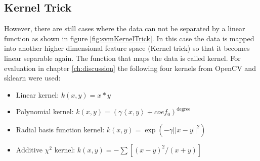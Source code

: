 \subsection*{Kernel Trick}
However, there are still cases where the data can not be separated by a linear function as shown in figure \ref{fig:svmKernelTrick}. In this case the data is mapped into another higher dimensional feature space {(Kernel trick)} so that it becomes linear separable again. The function that maps the data is called kernel. For evaluation in chapter \ref{ch:discussion} the following four kernels from OpenCV \cite{bradski2000opencv} and sklearn \cite{Pedregosa2011} were used:
\begin{itemize}
	\item Linear kernel: $k(x,y)=x*y$
	\item Polynomial kernel: $k(x,y)=(\gamma \left\langle x, y \right\rangle + coef_0)^\text{degree}$
	\item Radial basis function kernel: $k(x,y)=\exp(-\gamma ||x-y||^2)$
	\item Additive $\chi^2$ kernel: $ k(x,y)=-\sum \left[ (x-y)^2 / (x+y)\right] $
\end{itemize}
